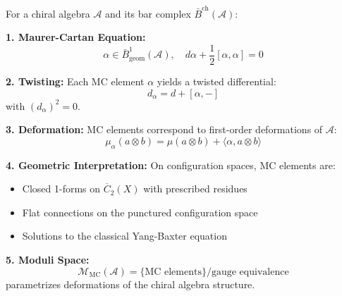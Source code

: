 \begin{theorem}\label{thm:MC-deformation}
For a chiral algebra $\mathcal{A}$ and its bar complex $\bar{B}^{\text{ch}}(\mathcal{A})$:

\textbf{1. Maurer-Cartan Equation:}
$$\alpha \in \bar{B}^1_{\text{geom}}(\mathcal{A}), \quad d\alpha + \frac{1}{2}[\alpha, \alpha] = 0$$

\textbf{2. Twisting:}
Each MC element $\alpha$ yields a twisted differential:
$$d_{\alpha} = d + [\alpha, -]$$
with $(d_{\alpha})^2 = 0$.

\textbf{3. Deformation:}
MC elements correspond to first-order deformations of $\mathcal{A}$:
$$\mu_{\alpha}(a \otimes b) = \mu(a \otimes b) + \langle \alpha, a \otimes b \rangle$$

\textbf{4. Geometric Interpretation:}
On configuration spaces, MC elements are:
\begin{itemize}
\item Closed 1-forms on $\overline{C}_2(X)$ with prescribed residues
\item Flat connections on the punctured configuration space
\item Solutions to the classical Yang-Baxter equation
\end{itemize}

\textbf{5. Moduli Space:}
$$\mathcal{M}_{\text{MC}}(\mathcal{A}) = \{\text{MC elements}\}/\text{gauge equivalence}$$
parametrizes deformations of the chiral algebra structure.
\end{theorem}
 

